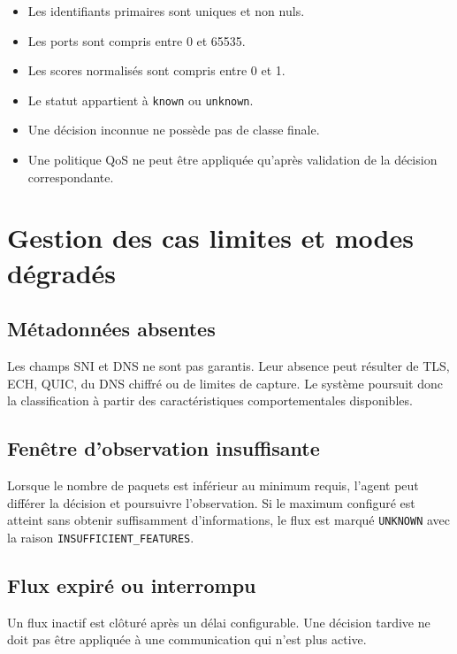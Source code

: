 \begin{itemize}
    \item Les identifiants primaires sont uniques et non nuls.
    \item Les ports sont compris entre 0 et 65535.
    \item Les scores normalisés sont compris entre 0 et 1.
    \item Le statut appartient à \texttt{known} ou \texttt{unknown}.
    \item Une décision inconnue ne possède pas de classe finale.
    \item Une politique QoS ne peut être appliquée qu'après
    validation de la décision correspondante.
\end{itemize}

\section{Gestion des cas limites et modes dégradés}

\subsection{Métadonnées absentes}

Les champs SNI et DNS ne sont pas garantis. Leur absence
peut résulter de TLS, ECH, QUIC, du DNS chiffré ou de limites
de capture. Le système poursuit donc la classification à
partir des caractéristiques comportementales disponibles.

\subsection{Fenêtre d'observation insuffisante}

Lorsque le nombre de paquets est inférieur au minimum requis,
l'agent peut différer la décision et poursuivre l'observation.
Si le maximum configuré est atteint sans obtenir suffisamment
d'informations, le flux est marqué \texttt{UNKNOWN} avec
la raison \texttt{INSUFFICIENT\_FEATURES}.

\subsection{Flux expiré ou interrompu}

Un flux inactif est clôturé après un délai configurable.
Une décision tardive ne doit pas être appliquée à une
communication qui n'est plus active.

